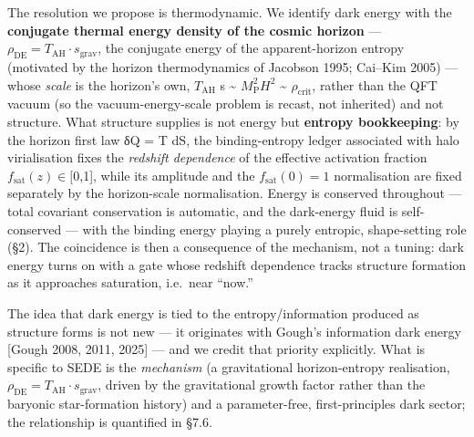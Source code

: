 \documentclass[
  10pt,
]{article}
\begin{document}
The resolution we propose is thermodynamic. We identify dark energy with
the \textbf{conjugate thermal energy density of the cosmic horizon} ---
\(\rho _{\mathrm{DE}} = T_{\mathrm{AH}}\cdot s_{\mathrm{grav}}\), the
conjugate energy of the apparent-horizon entropy (motivated by the
horizon thermodynamics of Jacobson 1995; Cai--Kim 2005) --- whose
\emph{scale} is the horizon's own, \(T_{\mathrm{AH}}\) s
\textasciitilde{} \(M_{\mathrm{P}}^{2}H^{2}\) \textasciitilde{}
\(\rho _{\mathrm{crit}}\), rather than the QFT vacuum (so the
vacuum-energy-scale problem is recast, not inherited) and not structure.
What structure supplies is not energy but \textbf{entropy bookkeeping}:
by the horizon first law δQ = T dS, the binding-entropy ledger
associated with halo virialisation fixes the \emph{redshift dependence}
of the effective activation fraction
\(f_{\mathrm{sat}}(z) \in  [0\),1{]}, while its amplitude and the
\(f_{\mathrm{sat}}(0) = 1\) normalisation are fixed separately by the
horizon-scale normalisation. Energy is conserved throughout --- total
covariant conservation is automatic, and the dark-energy fluid is
self-conserved --- with the binding energy playing a purely entropic,
shape-setting role (§2). The coincidence is then a consequence of the
mechanism, not a tuning: dark energy turns on with a gate whose redshift
dependence tracks structure formation as it approaches saturation,
i.e.~near ``now.''

The idea that dark energy is tied to the entropy/information produced as
structure forms is not new --- it originates with Gough's information
dark energy {[}Gough 2008, 2011, 2025{]} --- and we credit that priority
explicitly. What is specific to SEDE is the \emph{mechanism} (a
gravitational horizon-entropy realisation,
\(\rho _{\mathrm{DE}} = T_{\mathrm{AH}}\cdot s_{\mathrm{grav}}\), driven
by the gravitational growth factor rather than the baryonic
star-formation history) and a parameter-free, first-principles dark
sector; the relationship is quantified in §7.6.
\end{document}
